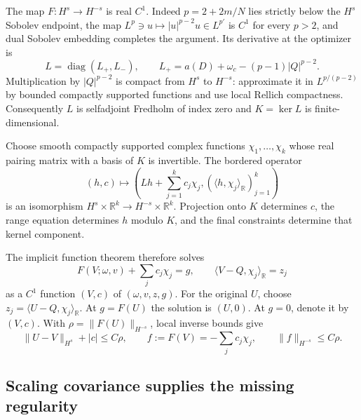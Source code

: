 \documentclass[11pt]{article}
\theoremstyle{definition}
\theoremstyle{remark}
\DeclareMathOperator{\diag}{diag}
\newcommand{\R}{\mathbb R}
\newcommand{\ip}[2]{\langle #1,#2\rangle}
\newcommand{\norm}[1]{\lVert #1\rVert}
\begin{document}
The map $F:H^s\to H^{-s}$ is real $C^1$. Indeed $p=2+2m/N$ lies strictly below the $H^s$ Sobolev endpoint, the map $L^p\ni u\mapsto |u|^{p-2}u\in L^{p'}$ is $C^1$ for every $p>2$, and dual Sobolev embedding completes the argument. Its derivative at the optimizer is
\[
 L=\diag(L_+,L_-),\qquad
 L_+=a(D)+\omega_c-(p-1)|Q|^{p-2}.
\]
Multiplication by $|Q|^{p-2}$ is compact from $H^s$ to $H^{-s}$: approximate it in $L^{p/(p-2)}$ by bounded compactly supported functions and use local Rellich compactness. Consequently $L$ is selfadjoint Fredholm of index zero and $K=\ker L$ is finite-dimensional.

Choose smooth compactly supported complex functions $\chi_1,\ldots,\chi_k$ whose real pairing matrix with a basis of $K$ is invertible. The bordered operator
\begin{equation}\label{eq:border}
 (h,c)\longmapsto
 \left(Lh+\sum_{j=1}^kc_j\chi_j,
                 (\ip h{\chi_j}_{\R})_{j=1}^k\right)
\end{equation}
is an isomorphism $H^s\times\R^k\to H^{-s}\times\R^k$. Projection onto $K$ determines $c$, the range equation determines $h$ modulo $K$, and the final constraints determine that kernel component.

The implicit function theorem therefore solves
\begin{equation}\label{eq:borderedsystem}
 F(V;\omega,v)+\sum_jc_j\chi_j=g,\qquad
 \ip{V-Q}{\chi_j}_{\R}=z_j
\end{equation}
as a $C^1$ function $(V,c)$ of $(\omega,v,z,g)$. For the original $U$, choose $z_j=\ip{U-Q}{\chi_j}_{\R}$. At $g=F(U)$ the solution is $(U,0)$. At $g=0$, denote it by $(V,c)$. With $\rho=\norm{F(U)}_{H^{-s}}$, local inverse bounds give
\begin{equation}\label{eq:regularize}
 \norm{U-V}_{H^s}+|c|\le C\rho,
 \qquad f:=F(V)=-\sum_jc_j\chi_j,\qquad \norm f_{H^{-s}}\le C\rho.
\end{equation}

\subsection{Scaling covariance supplies the missing regularity}
\end{document}
